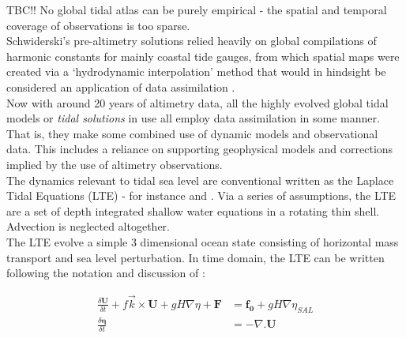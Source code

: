 
TBC!! 
No global tidal atlas can be purely empirical - the spatial and temporal coverage of observations is too sparse.\\
Schwiderski's pre-altimetry solutions relied heavily on global compilations of harmonic constants for mainly coastal tide gauges, from which spatial maps were created via a `hydrodynamic interpolation' method that would in hindsight be considered an application of data assimilation \cite[pp822]{Egbert:1994wz}.\\
Now with around 20 years of altimetry data, all the highly evolved global tidal models or \emph{tidal solutions} in use all employ data assimilation in some manner.  That is, they make some combined use of dynamic models and observational data.  This includes a reliance on supporting geophysical models and corrections implied by the use of altimetry observations.\\



The dynamics relevant to tidal sea level are conventional written as the Laplace Tidal Equations (LTE) - for instance \cite[9.8]{gill1982atmosphere} and \cite{Hendershott:1981ub}.   
Via a series of assumptions, the LTE are a set of depth integrated shallow water equations in a rotating thin shell.  Advection is neglected altogether.\\
The LTE evolve a simple 3 dimensional ocean state consisting of horizontal mass transport and sea level perturbation. In time domain, the LTE can be written following the notation and discussion of \cite[pp185]{Egbert:2002ug}:

\begin{align}
\label{E:LTE_momtm}
\frac{\delta \mathbf{U} }{ \delta t} + f\vec{k} \times \mathbf{U} + gH\nabla \eta  + \mathbf{F} &= \mathbf{f_0} + gH \nabla \eta_{SAL} \\
\label{E:LTE_cont}
\frac{\delta \mathbf{\eta} }{\delta t} &= -\nabla.\mathbf{U} 
\end{align}

